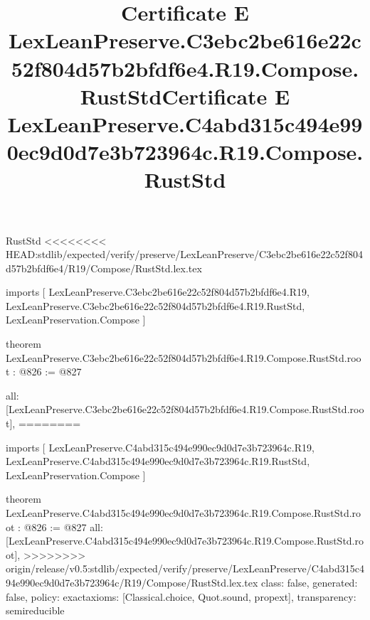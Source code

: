 \begin{lexlean}{RustStd}
<<<<<<<< HEAD:stdlib/expected/verify/preserve/LexLeanPreserve/C3ebc2be616e22c52f804d57b2bfdf6e4/R19/Compose/RustStd.lex.tex
\title{Certificate E LexLeanPreserve.C3ebc2be616e22c52f804d57b2bfdf6e4.R19.Compose.RustStd}
\begin{coremodule}
imports [
  LexLeanPreserve.C3ebc2be616e22c52f804d57b2bfdf6e4.R19,
  LexLeanPreserve.C3ebc2be616e22c52f804d57b2bfdf6e4.R19.RustStd,
  LexLeanPreservation.Compose
]

theorem LexLeanPreserve.C3ebc2be616e22c52f804d57b2bfdf6e4.R19.Compose.RustStd.root : @826 := @827 {
  all: [LexLeanPreserve.C3ebc2be616e22c52f804d57b2bfdf6e4.R19.Compose.RustStd.root],
========
\title{Certificate E LexLeanPreserve.C4abd315c494e990ec9d0d7e3b723964c.R19.Compose.RustStd}
\begin{coremodule}
imports [
  LexLeanPreserve.C4abd315c494e990ec9d0d7e3b723964c.R19,
  LexLeanPreserve.C4abd315c494e990ec9d0d7e3b723964c.R19.RustStd,
  LexLeanPreservation.Compose
]

theorem LexLeanPreserve.C4abd315c494e990ec9d0d7e3b723964c.R19.Compose.RustStd.root : @826 := @827 {
  all: [LexLeanPreserve.C4abd315c494e990ec9d0d7e3b723964c.R19.Compose.RustStd.root],
>>>>>>>> origin/release/v0.5:stdlib/expected/verify/preserve/LexLeanPreserve/C4abd315c494e990ec9d0d7e3b723964c/R19/Compose/RustStd.lex.tex
  class: false,
  generated: false,
  policy: exact{axioms: [Classical.choice, Quot.sound, propext]},
  transparency: semireducible
}


\end{coremodule}}
\end{coremodule}
\end{lexlean}
